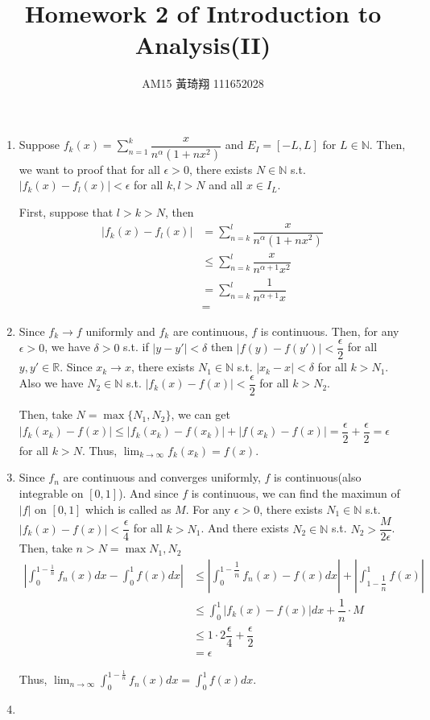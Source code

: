 \documentclass[12pt]{article}
\title{Homework 2 of Introduction to Analysis(II)}
\author{AM15 黃琦翔 111652028}
\begin{document}
\maketitle
\begin{enumerate}
    \item Suppose $f_k(x) = \displaystyle\sum_{n=1}^{k} \dfrac{x}{n^\alpha (1+nx^2)}$ and $E_I = [-L, L]$ for $L \in \mathbb{N}$.
    Then, we want to proof that 
    for all $\epsilon > 0$, there exists $N \in \mathbb{N}$ s.t. 
    $|f_k(x) - f_l(x)| < \epsilon$ for all $k, l > N$ and all $x \in I_L$.

    First, suppose that $l > k > N$, then \begin{align*}
        |f_k(x) - f_l(x)| &= \sum_{n=k}^l \dfrac{x}{n^\alpha (1+nx^2)}\\
        &\leq \displaystyle\sum_{n=k}^{l} \dfrac{x}{n^{\alpha+1} x^2}\\
        &= \displaystyle\sum_{n=k}^l \dfrac{1}{n^{\alpha+1} x}\\
        &= 
    \end{align*}


    \item Since $f_k \to f$ uniformly and $f_k$ are continuous, $f$ is continuous.
    Then, for any $\epsilon > 0$, we have $\delta > 0 $ s.t. if $|y - y'| < \delta$ then $|f(y) - f(y')| < \dfrac{\epsilon}{2}$ for all $y, y' \in \mathbb{R}$.
    Since $x_k \to x$, there exists $N_1 \in \mathbb{N}$ s.t. $|x_k - x| < \delta$ for all $k > N_1$.
    Also we have $N_2 \in \mathbb{N}$ s.t. $|f_k(x) - f(x)| < \dfrac{\epsilon}{2}$ for all $k > N_2$.

    Then, take $N  = \max\{ N_1, N_2\}$, we can get $|f_k(x_k) - f(x)| \leq |f_k(x_k) - f(x_k)| + |f(x_k) - f(x)| = \dfrac{\epsilon}{2} + \dfrac{\epsilon}{2} = \epsilon$ for all $k > N$.
    Thus, $\displaystyle\lim_{k\to\infty} f_k(x_k) = f(x)$.

    \item Since $f_n$ are continuous and converges uniformly, $f$ is continuous(also integrable on $[0, 1]$).
    And since $f$ is continuous, we can find the maximun of $|f|$ on $[0, 1]$ which is called as $M$.
    For any $\epsilon > 0$, there exists $N_1 \in \mathbb{N}$ s.t. $|f_k(x) - f(x)| < \dfrac{\epsilon}{4}$ for all $k > N_1$.
    And there exists $N_2 \in \mathbb{N}$ s.t. $N_2 > \dfrac{M}{2\epsilon}$.
    Then, take $n > N = \max{N_1, N_2}$ \begin{align*}
        \left|\int_0^{1-\frac{1}{n}} f_n(x) dx - \int_0^1 f(x) dx\right| &\leq \left|\int_{0}^{1-\dfrac{1}{n}} f_n(x) - f(x) dx\right| + \left|\int_{1-\dfrac{1}{n}}^{1} f(x)\right|\\
        &\leq \int_0^1 |f_k(x) - f(x)| dx + \dfrac{1}{n} \cdot M\\
        &\leq 1 \cdot 2\dfrac{\epsilon}{4} + \dfrac{\epsilon}{2}\\
        &= \epsilon
    \end{align*}

    Thus, $\displaystyle\lim_{n\to\infty} \displaystyle\int_{0}^{1-\frac{1}{n}} f_n(x) dx = \displaystyle\int_0^1 f(x) dx$.

    \item 
\end{enumerate}
\end{document}
